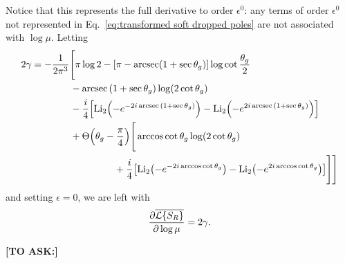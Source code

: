 \documentclass[11pt,twoside,reqno]{amsart}
\theoremstyle{plain}
\theoremstyle{remark}
\theoremstyle{definition}
\theoremstyle{remark}
\theoremstyle{definition}
\theoremstyle{definition}
\newcommand{\cL}{\mathcal{L}}
\newcommand{\Li}{\mathrm{Li}}
\begin{document}
	Notice that this represents the full derivative to order $\epsilon^0$: any terms of order $\epsilon^0$ not represented in Eq.~\ref{eq:transformed soft dropped poles} are not associated with $\log \mu$. Letting
	\begin{equation}
	\begin{aligned}
		2\gamma &= -\frac{1}{2\pi^3} \Bigg[\pi \log 2 - \qty[\pi - \arcsec(1 + \sec\theta_g)]\log\cot\frac{\theta_g}{2} \\
			&\qquad\qquad - \arcsec\qty(1 + \sec\theta_g) \log(2\cot\theta_g) \\
			&\qquad\qquad - \frac{i}{4}\qty[\Li_2\qty(-e^{-2i\arcsec\qty(1 + \sec\theta_g)}) - \Li_2\qty(-e^{2i\arcsec\qty(1 + \sec\theta_g)})] \\
			&\qquad\qquad+ \Theta\qty(\theta_g - \frac{\pi}{4})\Bigg[ \arccos\cot\theta_g \log(2\cot\theta_g) \\
			&\hspace{3cm}+ \frac{i}{4}\qty[\Li_2\qty(-e^{-2i\arccos\cot\theta_g}) - \Li_2\qty(-e^{2i\arccos\cot\theta_g})] \Bigg] \Bigg]
	\end{aligned}
	\end{equation}
	and setting $\epsilon = 0$, we are left with
	\begin{equation}
		\frac{\partial \overline{\cL\qty{S_R}}}{\partial \log \mu} = 2\gamma.
	\end{equation}

	\textbf{[TO ASK:]}




\end{document}
